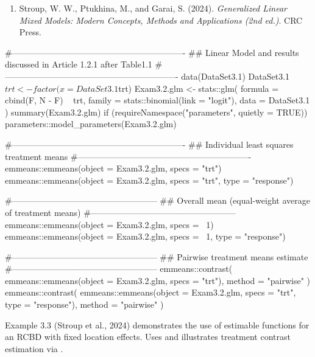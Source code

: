 \documentclass[a4paper]{book}
\begin{document}
%
\begin{References}
\begin{enumerate}

\item{} Stroup, W. W., Ptukhina, M., and Garai, S. (2024).
\emph{Generalized Linear Mixed Models: Modern Concepts, Methods and Applications (2nd ed.)}.
CRC Press.

\end{enumerate}

\end{References}
%
\begin{SeeAlso}
\end{SeeAlso}
%
\begin{Examples}
\begin{ExampleCode}
#-------------------------------------------------------------
## Linear Model and results discussed in Article 1.2.1 after Table1.1
#-------------------------------------------------------------
data(DataSet3.1)
DataSet3.1$trt <- factor(x = DataSet3.1$trt)
Exam3.2.glm <- stats::glm(
  formula = cbind(F, N - F) ~ trt,
  family  = stats::binomial(link = "logit"),
  data    = DataSet3.1
)
summary(Exam3.2.glm)
if (requireNamespace("parameters", quietly = TRUE)) {
  parameters::model_parameters(Exam3.2.glm)
}

#-------------------------------------------------------------
## Individual least squares treatment means
#-------------------------------------------------------------
emmeans::emmeans(object = Exam3.2.glm, specs = "trt")
emmeans::emmeans(object = Exam3.2.glm, specs = "trt", type = "response")

#---------------------------------------------------
## Overall mean (equal-weight average of treatment means)
#---------------------------------------------------
emmeans::emmeans(object = Exam3.2.glm, specs = ~1)
emmeans::emmeans(object = Exam3.2.glm, specs = ~1, type = "response")

#---------------------------------------------------
## Pairwise treatment means estimate
#---------------------------------------------------
emmeans::contrast(
  emmeans::emmeans(object = Exam3.2.glm, specs = "trt"),
  method = "pairwise"
)
emmeans::contrast(
  emmeans::emmeans(object = Exam3.2.glm, specs = "trt", type = "response"),
  method = "pairwise"
)
\end{ExampleCode}
\end{Examples}
%
\begin{Description}
Example 3.3 (Stroup et al., 2024) demonstrates the use of
estimable functions for an RCBD with fixed location effects.
Uses  and illustrates treatment contrast estimation
via .
\end{Description}
\end{document}
